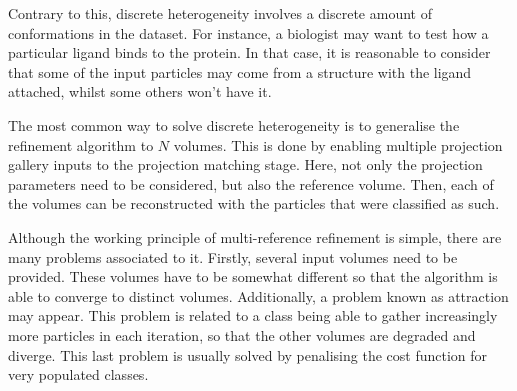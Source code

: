 \documentclass[../main.tex]{subfiles}
\begin{document}
Contrary to this, discrete heterogeneity involves a discrete amount of conformations in the dataset. For instance, a biologist may want to test how a particular ligand binds to the protein. In that case, it is reasonable to consider that some of the input particles may come from a structure with the ligand attached, whilst some others won't have it.

The most common way to solve discrete heterogeneity is to generalise the refinement algorithm to $N$ volumes. This is done by enabling multiple projection gallery inputs to the projection matching stage. Here, not only the projection parameters need to be considered, but also the reference volume. Then, each of the volumes can be reconstructed with the particles that were classified as such\cite{scheres2005}.

Although the working principle of multi-reference refinement is simple, there are many problems associated to it. Firstly, several input volumes need to be provided. These volumes have to be somewhat different so that the algorithm is able to converge to distinct volumes. Additionally, a problem known as attraction may appear. This problem is related to a class being able to gather increasingly more particles in each iteration, so that the other volumes are degraded and diverge. This last problem is usually solved by penalising the cost function for very populated classes\cite{sorzano2022}.
\end{document}
